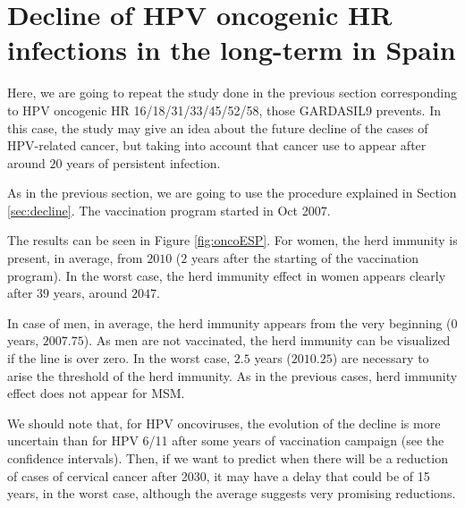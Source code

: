 \section{Decline of HPV oncogenic HR infections in the long-term in Spain}\label{sec:onco_spain}
Here, we are going to repeat the study done in the previous section corresponding to HPV oncogenic HR 16/18/31/33/45/52/58, those GARDASIL9 prevents. In this case, the study may give an idea about the future decline of the cases of HPV-related cancer, but taking into account that cancer use to appear after around $20$ years of persistent infection. 

As in the previous section, we are going to use the procedure explained in Section \ref{sec:decline}. The vaccination program started in Oct 2007.

The results can be seen in Figure \ref{fig:oncoESP}. For women, the herd immunity is present, in average, from $2010$ ($2$ years after the starting of the vaccination program). In the worst case, the herd immunity effect in women appears clearly after $39$ years, around $2047$.

In case of men, in average, the herd immunity appears from the very beginning ($0$ years, $2007.75$). As men are not vaccinated, the herd immunity can be visualized if the line is over zero. In the worst case, $2.5$ years ($2010.25$) are necessary to arise the threshold of the herd immunity. As in the previous cases, herd immunity effect does not appear for MSM.

We should note that, for HPV oncoviruses, the evolution of the decline is more uncertain than for HPV 6/11 after some years of vaccination campaign (see the confidence intervals). Then, if we want to predict when there will be a reduction of cases of cervical cancer after 2030, it may have a delay that could be of 15 years, in the worst case, although the average suggests very promising reductions.

